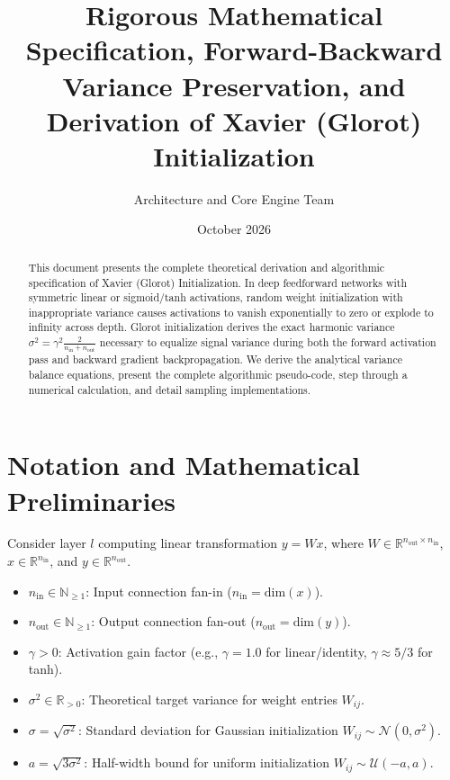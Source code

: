 \documentclass[11pt,a4paper]{article}
\title{\textbf{Rigorous Mathematical Specification, Forward-Backward Variance Preservation, and Derivation of Xavier (Glorot) Initialization}}
\author{Architecture and Core Engine Team}
\date{October 2026}
\theoremstyle{definition}
\begin{document}
\maketitle

\begin{abstract}
This document presents the complete theoretical derivation and algorithmic specification of Xavier (Glorot) Initialization. In deep feedforward networks with symmetric linear or sigmoid/tanh activations, random weight initialization with inappropriate variance causes activations to vanish exponentially to zero or explode to infinity across depth. Glorot initialization derives the exact harmonic variance $\sigma^2 = \gamma^2 \frac{2}{n_{\text{in}} + n_{\text{out}}}$ necessary to equalize signal variance during both the forward activation pass and backward gradient backpropagation. We derive the analytical variance balance equations, present the complete algorithmic pseudo-code, step through a numerical calculation, and detail sampling implementations.
\end{abstract}

\section{Notation and Mathematical Preliminaries}

Consider layer $l$ computing linear transformation $y = W x$, where $W \in \mathbb{R}^{n_{\text{out}} \times n_{\text{in}}}$, $x \in \mathbb{R}^{n_{\text{in}}}$, and $y \in \mathbb{R}^{n_{\text{out}}}$.

\begin{itemize}
    \item $n_{\text{in}} \in \mathbb{N}_{\ge 1}$: Input connection fan-in ($n_{\text{in}} = \text{dim}(x)$).
    \item $n_{\text{out}} \in \mathbb{N}_{\ge 1}$: Output connection fan-out ($n_{\text{out}} = \text{dim}(y)$).
    \item $\gamma > 0$: Activation gain factor (e.g., $\gamma = 1.0$ for linear/identity, $\gamma \approx 5/3$ for tanh).
    \item $\sigma^2 \in \mathbb{R}_{> 0}$: Theoretical target variance for weight entries $W_{ij}$.
    \item $\sigma = \sqrt{\sigma^2}$: Standard deviation for Gaussian initialization $W_{ij} \sim \mathcal{N}(0, \sigma^2)$.
    \item $a = \sqrt{3 \sigma^2}$: Half-width bound for uniform initialization $W_{ij} \sim \mathcal{U}(-a, a)$.
\end{itemize}
\end{document}
